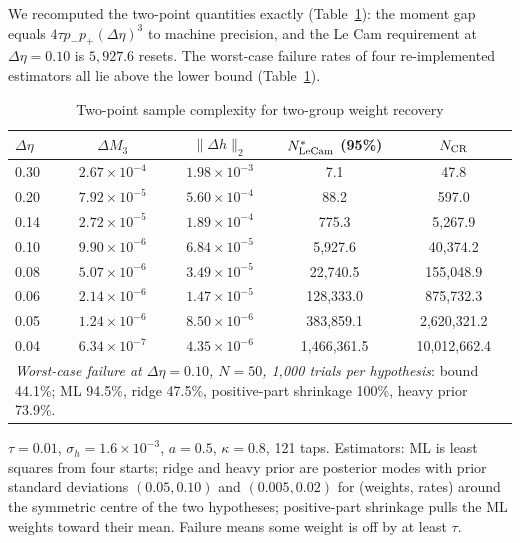 \documentclass[12pt]{article}
\theoremstyle{definition}
\theoremstyle{remark}
\begin{document}
We recomputed the two-point quantities exactly (Table~\ref{tab:lecam}): the moment gap equals $4\tau p_-p_+(\Delta\eta)^3$ to machine precision, and the Le Cam requirement at $\Delta\eta=0.10$ is $5{,}927.6$ resets. The worst-case failure rates of four re-implemented estimators all lie above the lower bound (Table~\ref{tab:lecam}).

\begin{table}[t]\centering\small
\begin{threeparttable}
\caption{Two-point sample complexity for two-group weight recovery}\label{tab:lecam}
\begin{tabular}{lcccc}
\toprule
$\Delta\eta$ & $\Delta M_3$ & $\|\Delta h\|_2$ & $N^*_{\rm LeCam}$ (95\%) & $N_{\rm CR}$\\
\midrule
0.30 & $2.67\times10^{-4}$ & $1.98\times10^{-3}$ & 7.1 & 47.8\\
0.20 & $7.92\times10^{-5}$ & $5.60\times10^{-4}$ & 88.2 & 597.0\\
0.14 & $2.72\times10^{-5}$ & $1.89\times10^{-4}$ & 775.3 & 5{,}267.9\\
0.10 & $9.90\times10^{-6}$ & $6.84\times10^{-5}$ & 5{,}927.6 & 40{,}374.2\\
0.08 & $5.07\times10^{-6}$ & $3.49\times10^{-5}$ & 22{,}740.5 & 155{,}048.9\\
0.06 & $2.14\times10^{-6}$ & $1.47\times10^{-5}$ & 128{,}333.0 & 875{,}732.3\\
0.05 & $1.24\times10^{-6}$ & $8.50\times10^{-6}$ & 383{,}859.1 & 2{,}620{,}321.2\\
0.04 & $6.34\times10^{-7}$ & $4.35\times10^{-6}$ & 1{,}466{,}361.5 & 10{,}012{,}662.4\\
\midrule
\multicolumn{5}{p{0.85\textwidth}}{\emph{Worst-case failure at $\Delta\eta=0.10$, $N=50$, 1,000 trials per hypothesis}: bound 44.1\%; ML 94.5\%, ridge 47.5\%, positive-part shrinkage 100\%, heavy prior 73.9\%.}\\
\bottomrule
\end{tabular}
\begin{tablenotes}\footnotesize\item $\tau=0.01$, $\sigma_h=1.6\times10^{-3}$, $a=0.5$, $\kappa=0.8$, 121 taps. Estimators: ML is least squares from four starts; ridge and heavy prior are posterior modes with prior standard deviations $(0.05,0.10)$ and $(0.005,0.02)$ for (weights, rates) around the symmetric centre of the two hypotheses; positive-part shrinkage pulls the ML weights toward their mean. Failure means some weight is off by at least $\tau$.\end{tablenotes}
\end{threeparttable}
\end{table}
\end{document}
